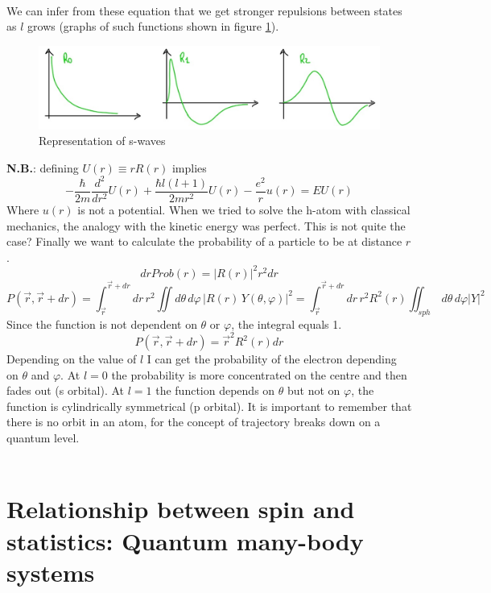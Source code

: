\\
We can infer from these equation that we get stronger repulsions between states as $l$ grows (graphs of such functions shown in figure \ref{fig_swaves}).\\
\begin{figure}[htbp!]
	\centering
	\includegraphics[scale=0.30]{img_5.jpg}
	\caption{Representation of s-waves}
	\label{fig_swaves}
\end{figure}
\textbf{N.B.}: defining $U(r) \equiv rR(r)$ implies
\[
-\frac{\hbar}{2m} \frac{d^2}{dr^2} U(r) + \frac{\hbar l(l+1)}{2mr^2} U(r) - \frac{e^2}{r} u(r) = E U(r)
\]
Where $u(r)$ is not a potential. When we tried to solve the h-atom with classical mechanics, the analogy with the kinetic energy was perfect. This is not quite the case?
Finally we want to calculate the probability of a particle to be at distance $r$.
\[
drProb(r)=|R(r)|^2r^2dr
\]
\[
P(\vec{r},\vec{r}+dr)=\int_{\vec{r}}^{\vec{r}+dr}dr\,r^2\iint d\theta\,d\varphi\,|R(r)\,Y(\theta,\varphi)|^2=\int_{\vec{r}}^{\vec{r}+dr}dr\,r^2R^2(r)\iint_{sph}\,d\theta\,d\varphi|Y|^2
\]
Since the function is not dependent on $\theta$ or $\varphi$, the integral equals 1.
\[
P(\vec{r},\vec{r}+dr)=\vec{r}^2R^2(r)dr
\]
Depending on the value of $l$ I can get the probability of the electron depending on $\theta$ and $\varphi$. At $l=0$ the probability is more concentrated on the centre and then fades out (s orbital). At $l=1$ the function depends on $\theta$ but not on $\varphi$, the function is cylindrically symmetrical (p orbital). It is important to remember that there is no orbit in an atom, for the concept of trajectory breaks down on a quantum level.\\
\\

\section{Relationship between spin and statistics: Quantum many-body systems}
